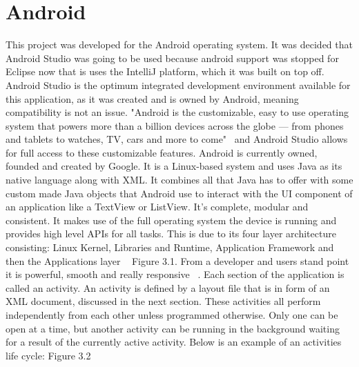 \section{Android}
This project was developed for the Android operating system. It was decided that Android Studio was going to be used because android support was stopped for Eclipse now that is uses the IntelliJ platform, which it was built on top off. Android Studio is the optimum integrated development environment available for this application, as it was created and is owned by Android, meaning compatibility is not an issue. "Android is the customizable, easy to use operating system that powers more than a billion devices across the globe — from phones and tablets to watches, TV, cars and more to come"~\cite{android} and Android Studio allows for full access to these customizable features. Android is currently owned, founded and created by Google. It is a Linux-based system and uses Java as its native language along with XML. It combines all that Java has to offer with some custom made Java objects that Android use to interact with the UI component of an application like a TextView or ListView. It's complete, modular and consistent. It makes use of the full operating system the device is running and provides high level APIs for all tasks. This is due to its four layer architecture consisting: Linux Kernel, Libraries and Runtime, Application Framework and then the Applications layer ~\cite{androidarch} Figure 3.1. From a developer and users stand point it is powerful, smooth and really responsive ~\cite{androidsystem}. Each section of the application is called an activity. An activity is defined by a layout file that is in form of an XML document, discussed in the next section. These activities all perform independently from each other unless programmed otherwise. Only one can be open at a time, but another activity can be running in the background waiting for a result of the currently active activity. Below is an example of an activities life cycle: Figure 3.2

